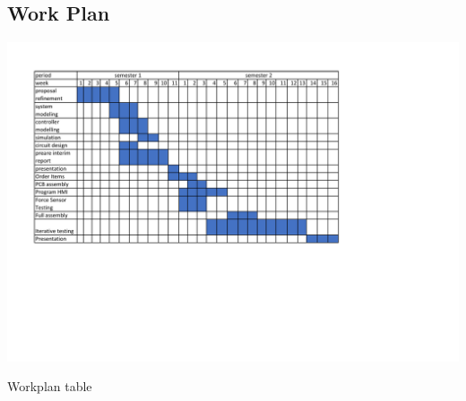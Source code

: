 \subsection{Work Plan}
\begin{center}
\begin{table}[!h]
\centering
\includegraphics[width=0.95\linewidth]{Figures/workplan}
\caption{Workplan table}
\end{table}
\end{center}
